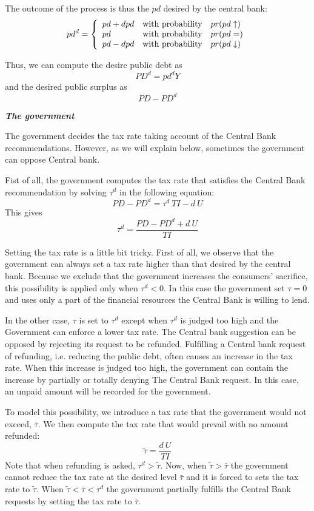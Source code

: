 \documentclass{book}
\begin{document}
The outcome of the process is thus the $pd$ desired by the central bank:
\[
	pd^d=\left\{ 
		\begin{array}{l l l}
			pd+dpd& \textnormal{with probability} &pr(pd\uparrow)\\ 
			pd& \textnormal{with probability} &pr(pd=)\\ 
			pd-dpd& \textnormal{with probability} &pr(pd\downarrow)\\ 
		\end{array}
		\right.
\]

Thus, we can compute the desire public debt as
\[
PD^d=pd^dY
\]
and the desired public surplus as
\[
PD-PD^d
\]

\vskip5mm
\textit{\textbf{The government}}

The government decides the tax rate taking account of the Central Bank recommendations. However, as we will explain below, sometimes the government can oppose Central bank.

Fist of all, the government computes the tax rate that satisfies the Central Bank recommendation by solving $\tau^d$ in the following equation:
\[
PD-PD^d=\tau^d \ TI - d \ U
\]
This gives
\[
	\tau^d= \frac{PD-PD^d+d \ U}{TI}
\]

Setting the tax rate is a little bit tricky. 
First of all, we observe that the government can always set a tax rate higher than that desired by the central bank. Because we exclude that the government increases the consumers' sacrifice, this possibility is applied only when $\tau^d<0$. In this case the government set $\tau=0$ and uses only a part of the financial resources the Central Bank is willing to lend.

In the other case, $\tau$ is set to $\tau^d$ except when $\tau^d$ is judged too high and the Government can enforce a lower tax rate. The Central bank suggestion can be opposed by rejecting its request to be refunded. Fulfilling a Central bank request of refunding, i.e. reducing the public debt, often causes an increase in the tax rate. When this increase is judged too high, the government can contain the increase by partially or totally denying The Central Bank request. In this case, an unpaid amount will be recorded for the government.

To model this possibility, we introduce a tax rate that the government would not exceed, $\bar{\tau}$. We then compute the tax rate that would prevail with no amount refunded:
\[
	\tilde{\tau}= \frac{d \ U}{TI}
\]
Note that when refunding is asked, $\tau^d>\tilde{\tau}$. Now, when $\tilde{\tau}>\bar{\tau}$ the government cannot reduce the tax rate at the desired level  $\bar{\tau}$ and it is forced to sets the tax rate to $\tilde{\tau}$.  
When $\tilde{\tau}<\bar{\tau}<\tau^d$ the government partially fulfills the Central Bank requests by setting the tax rate to $\bar{\tau}$.  
\end{document}
